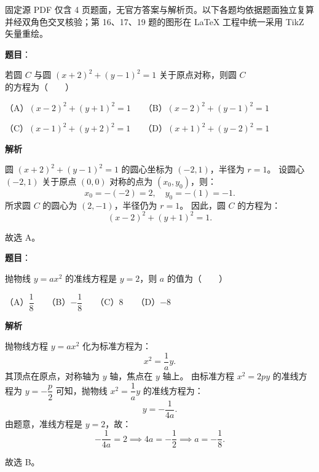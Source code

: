 

\begin{gktip}
固定源 PDF 仅含 4 页题面，无官方答案与解析页。以下各题均依据题面独立复算并经双角色交叉核验；第 16、17、19 题的图形在 LaTeX 工程中统一采用 TikZ 矢量重绘。
\end{gktip}

\begin{answer}

\textbf{题目}：

若圆 $C$ 与圆 $(x+2)^2 + (y-1)^2 = 1$ 关于原点对称，则圆 $C$ 的方程为\mbox{（　　）}

（A）$(x-2)^2 + (y+1)^2 = 1$　　（B）$(x-2)^2 + (y-1)^2 = 1$

（C）$(x-1)^2 + (y+2)^2 = 1$　　（D）$(x+1)^2 + (y-2)^2 = 1$

\textbf{解析}

圆 $(x+2)^2 + (y-1)^2 = 1$ 的圆心坐标为 $(-2, 1)$，半径为 $r = 1$。
设圆心 $(-2, 1)$ 关于原点 $(0, 0)$ 对称的点为 $(x_0, y_0)$，则：
\nopagebreak[4]
\[x_0 = -(-2) = 2, \quad y_0 = -(1) = -1.\]
所求圆 $C$ 的圆心为 $(2, -1)$，半径仍为 $r = 1$。
因此，圆 $C$ 的方程为：
\nopagebreak[4]
\[(x - 2)^2 + (y + 1)^2 = 1.\]

故选 A。


\end{answer}
\begin{answer}

\textbf{题目}：

抛物线 $y = ax^2$ 的准线方程是 $y = 2$，则 $a$ 的值为\mbox{（　　）}

（A）$\dfrac{1}{8}$　　（B）$-\dfrac{1}{8}$　　（C）8　　（D）$-8$

\textbf{解析}

抛物线方程 $y = ax^2$ 化为标准方程为：
\nopagebreak[4]
\[x^2 = \frac{1}{a} y.\]
其顶点在原点，对称轴为 $y$ 轴，焦点在 $y$ 轴上。
由标准方程 $x^2 = 2py$ 的准线方程为 $y = -\dfrac{p}{2}$ 可知，抛物线 $x^2 = \dfrac{1}{a} y$ 的准线方程为：
\nopagebreak[4]
\[y = -\frac{1}{4a}.\]
由题意，准线方程是 $y = 2$，故：
\nopagebreak[4]
\[-\frac{1}{4a} = 2 \implies 4a = -\frac{1}{2} \implies a = -\frac{1}{8}.\]

故选 B。


\end{answer}
